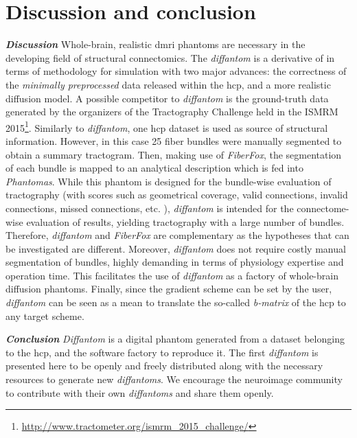 \documentclass[english]{frontiers/frontiersSCNS} %
\begin{document}
\section*{Discussion and conclusion}

\noindent\textbf{\textit{Discussion\textcolon}}\label{sec:discussion} %
Whole-brain, realistic \gls*{dmri} phantoms are necessary in the developing field of structural
  connectomics.
The \emph{diffantom} is a derivative of \citep{wilkins_fiber_2014} in terms of methodology for
  simulation with two major advances: the correctness of the \emph{minimally preprocessed} data
  \citep{glasser_minimal_2013} released within the \gls*{hcp}, and a more realistic diffusion
  model.
A possible competitor to \emph{diffantom} is the ground-truth data generated by the organizers of the
  Tractography Challenge held in the ISMRM 2015\footnote{\url{http://www.tractometer.org/ismrm_2015_challenge/}}.
Similarly to \emph{diffantom}, one \gls*{hcp} dataset is used as source of structural information.
However, in this case 25 fiber bundles were manually segmented to obtain a summary tractogram.
Then, making use of \emph{FiberFox}, the segmentation of each bundle is mapped to an analytical description
  which is fed into \emph{Phantomas}.
While this phantom is designed for the bundle-wise evaluation of tractography (with scores such as geometrical coverage,
  valid connections, invalid connections, missed connections, etc. \citep{cote_tractometer_2013}),
  \emph{diffantom} is intended for the connectome-wise evaluation of results, yielding tractography with
  a large number of bundles.
Therefore, \emph{diffantom} and \emph{FiberFox} are complementary as the hypotheses that can be investigated are different.
Moreover, \emph{diffantom} does not require costly manual segmentation of bundles, highly demanding in terms of physiology
  expertise and operation time.
This facilitates the use of \emph{diffantom} as a factory of whole-brain diffusion phantoms.
Finally, since the gradient scheme can be set by the user, \emph{diffantom} can be seen as a mean to translate the so-called
  \emph{b-matrix} of the \gls*{hcp} to any target scheme.

\noindent\textbf{\textit{Conclusion\textcolon}}\label{sec:conclusion} %
\emph{Diffantom} is a digital phantom generated from a dataset belonging to the \acrlong*{hcp}, and the software factory to
  reproduce it.
The first \emph{diffantom} is presented here to be openly and freely distributed along with the necessary resources to
  generate new \emph{diffantoms}.
We encourage the neuroimage community to contribute with their own \emph{diffantoms} and share them openly.
\end{document}
